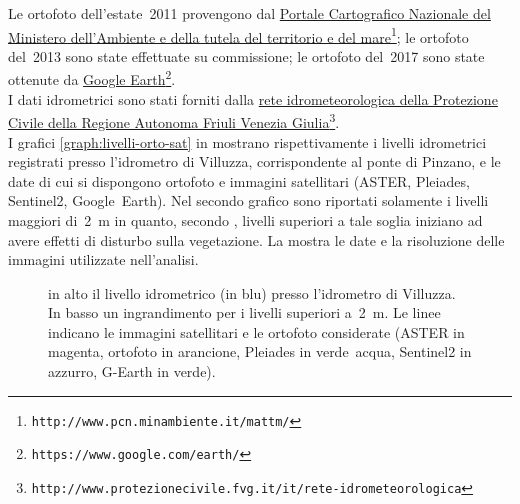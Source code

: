 Le ortofoto dell'estate~2011 provengono dal \href{http://www.pcn.minambiente.it/mattm/}{Portale Cartografico Nazionale del Ministero dell'Ambiente e della tutela del territorio e del mare}\footnote{\texttt{http://www.pcn.minambiente.it/mattm/}};
le ortofoto del~2013 sono state effettuate su commissione; 
%
%
le ortofoto del~2017 sono state ottenute da \href{https://www.google.com/earth/}{Google Earth}\footnote{\texttt{https://www.google.com/earth/}}.
\\
I dati idrometrici sono stati forniti dalla \href{http://www.protezionecivile.fvg.it/it/rete-idrometeorologica}{rete idrometeorologica della Protezione Civile della Regione Autonoma Friuli Venezia Giulia}\footnote{\texttt{http://www.protezionecivile.fvg.it/it/rete-idrometeorologica}}.
\\
I grafici \vref{graph:livelli-orto-sat} in  mostrano rispettivamente i livelli idrometrici registrati presso l'idrometro di Villuzza, corrispondente al ponte di Pinzano, e le date di cui si dispongono ortofoto e immagini satellitari (ASTER, Pleiades, Sentinel2, Google~Earth). 
Nel secondo grafico sono riportati solamente i livelli maggiori di~\SI{2}{\m} in quanto, secondo \cite{Bertoldi:2009-2m}, livelli superiori a tale soglia iniziano ad avere effetti di disturbo sulla vegetazione.
La  mostra le date e la risoluzione delle immagini utilizzate nell'analisi.
\begin{figure}[p]
	\centering
	
	
	\caption[livelli idrometrici e foto aeree - satellitari]{in alto il livello idrometrico (in blu) presso l'idrometro di Villuzza. 
	In basso un ingrandimento per i livelli superiori a~\SI{2}{\m}. Le linee indicano le immagini satellitari e le ortofoto considerate (ASTER in magenta, ortofoto in arancione, Pleiades in verde~acqua, Sentinel2 in azzurro, G-Earth in verde).}
	\label{graph:livelli-orto-sat}
\end{figure}
